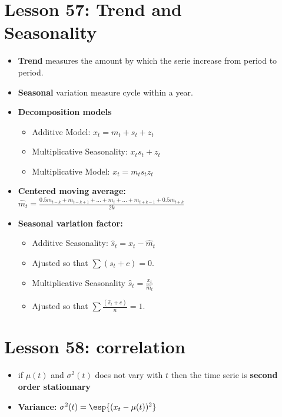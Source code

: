 \documentclass[10pt, french]{article}
\begin{document}
\begin{multicols*}{3}
\def\SectionColor{green!80!black}
\section*{Lesson 57: Trend and \\Seasonality}
\begin{itemize}[align=left,leftmargin=*]
  \item \textbf{Trend} measures the amount by which the serie increase from period to period.
  \item \textbf{Seasonal} variation measure cycle within a year.
  \item \textbf{Decomposition models}
  \begin{itemize}
     \item  Additive Model: $x_t = m_t + s_t + z_t$
     \item Multiplicative Seasonality: $x_t s_t + z_t$
     \item Multiplicative Model: $x_t = m_t s_t z_t$
  \end{itemize}
  \item \textbf{Centered moving average:} \\
  $\hat{m}_t = \frac{0.5m_{t-k} + m_{t-k+1} + ... + m_t + ... + m_{t+k-1} + 0.5m_{t+k}}{2k}$
  \item \textbf{Seasonal variation factor:}
  \begin{itemize}
     \item Additive Seasonality: $\hat{s}_t = x_t - \hat{m}_t$
     \item[] Ajusted so that $\sum (s_t + c) = 0$.
     \item  Multiplicative Seasonality $\hat{s}_t = \frac{x_t}{\hat{m}_t}$
     \item[] Ajusted so that $\sum \frac{(\hat{s}_t + c)}{n}= 1$.
  \end{itemize}
\end{itemize}

\section*{Lesson 58: correlation}
\begin{itemize}[align=left,leftmargin=*]
    \item if $\mu(t) $ and $\sigma^2(t)$ does not vary with $t$ then the time serie is \textbf{second order stationnary}
   \item \textbf{Variance:} $\sigma^2(t) = \esp{(x_t -       \mu(t))^2}$
\end{itemize}

\end{multicols*}
\end{document}
